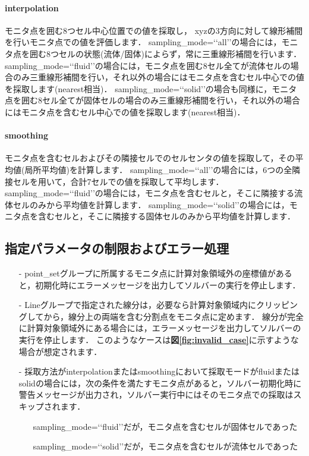 \paragraph{interpolation}
モニタ点を囲む8つセル中心位置での値を採取し，
xyzの3方向に対して線形補間を行いモニタ点での値を評価します．
sampling\_mode=\lq\lq all\rq\rq の場合には，モニタ点を囲む8つセルの状態(流体/固体)によらず，常に三重線形補間を行います．
sampling\_mode=\lq\lq fluid\rq\rq の場合には，モニタ点を囲む8セル全てが流体セルの場合のみ三重線形補間を行い，それ以外の場合にはモニタ点を含むセル中心での値を採取します(nearest相当)．
sampling\_mode=\lq\lq solid\rq\rq の場合も同様に，モニタ点を囲む8セル全てが固体セルの場合のみ三重線形補間を行い，それ以外の場合にはモニタ点を含むセル中心での値を採取します(nearest相当)．

\paragraph{smoothing}
モニタ点を含むセルおよびその隣接セルでのセルセンタの値を採取して，その平均値(局所平均値)を計算します．
sampling\_mode=\lq\lq all\rq\rq の場合には，6つの全隣接セルを用いて，合計7セルでの値を採取して平均します．
sampling\_mode=\lq\lq fluid\rq\rq の場合には，モニタ点を含むセルと，そこに隣接する流体セルのみから平均値を計算します．
sampling\_mode=\lq\lq solid\rq\rq の場合には，モニタ点を含むセルと，そこに隣接する固体セルのみから平均値を計算します．

\subsection{指定パラメータの制限およびエラー処理}
\begin{itemize}
\item[-] point\_setグループに所属するモニタ点に計算対象領域外の座標値があると，初期化時にエラーメッセージを出力してソルバーの実行を停止します．
\item[-] Lineグループで指定された線分は，必要なら計算対象領域内にクリッピングしてから，線分上の両端を含む分割点をモニタ点に定めます．
線分が完全に計算対象領域外にある場合には，エラーメッセージを出力してソルバーの実行を停止します．
このようなケースは\textbf{図\ref{fig:invalid_case}}に示すような場合が想定されます．
\item[-] 採取方法がinterpolationまたはsmoothingにおいて採取モードがfluidまたはsolidの場合には，次の条件を満たすモニタ点があると，ソルバー初期化時に警告メッセージが出力され，ソルバー実行中にはそのモニタ点での採取はスキップされます．
\begin{itemize}
\item[] sampling\_mode=\lq\lq fluid\rq\rq だが，モニタ点を含むセルが固体セルであった
\item[] sampling\_mode=\lq\lq solid\rq\rq だが，モニタ点を含むセルが流体セルであった
\end{itemize}
\end{itemize}

